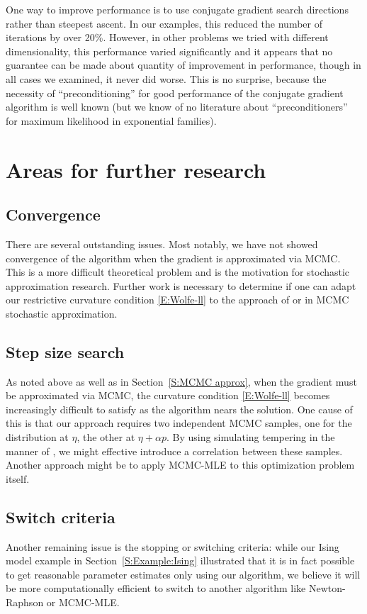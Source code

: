 One way to improve performance is to use conjugate gradient search directions rather 
than steepest ascent.  In our 
examples, this reduced the number of iterations by over 20\%.  However, in other 
problems we tried with different 
dimensionality, this performance varied significantly and it appears that no guarantee 
can be made about quantity of 
improvement in performance, though in all cases we examined, it never did worse.  This 
is no surprise, because the
necessity of ``preconditioning'' for good performance of the conjugate gradient 
algorithm is well known (but 
we know of no literature about ``preconditioners'' for 
maximum likelihood in exponential families).

\section{Areas for further research}
\subsection{Convergence}
There are several outstanding issues.  Most notably, we have not showed convergence of 
the algorithm when the gradient 
is approximated via MCMC.  This is a more difficult theoretical problem and is the 
motivation for stochastic 
approximation research.  
Further work is necessary to determine if one can adapt our restrictive curvature 
condition \eqref{E:Wolfe-ll} to the 
approach of \citet{Andrieu:2005} or \citet{Liang:2010} in MCMC stochastic 
approximation.  

\subsection{Step size search}
As noted above as well as in Section~\ref{S:MCMC approx}, when the gradient must be approximated
via MCMC, the curvature condition 
\eqref{E:Wolfe-ll} becomes increasingly difficult to satisfy as the algorithm nears the
solution.  One cause of this is that our approach requires two independent MCMC samples, one for
the distribution at $\eta$, the other at $\eta + \alpha p$.  By using simulating tempering
in the manner of \citep{Geyer:1995}, we might effective introduce a correlation between these
samples.  Another approach might be to apply MCMC-MLE to this optimization problem itself.

\subsection{Switch criteria}
Another remaining issue is the stopping or switching criteria: while our Ising model example
in Section~\ref{S:Example:Ising} illustrated that it is in fact possible to get reasonable 
parameter estimates only using our algorithm, we believe it will be more computationally
efficient to switch to another algorithm like Newton-Raphson or MCMC-MLE.  

